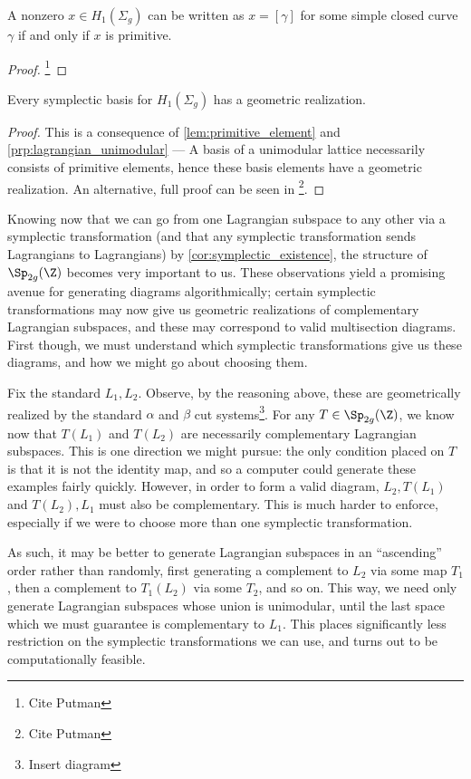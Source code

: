 \begin{lemma}
	\label{lem:primitive_element}
	A nonzero $x \in H_1(\Sigma_g)$ can be written as $x = [\gamma]$ for some simple closed curve $\gamma$ if and only if $x$ is primitive.
\end{lemma}
\begin{proof}
	\footnote{Cite Putman}
\end{proof}

\begin{theorem}
	Every symplectic basis for $H_1(\Sigma_g)$ has a geometric realization.
\end{theorem}
\begin{proof}
	This is a consequence of \autoref{lem:primitive_element} and \autoref{prp:lagrangian_unimodular} --- A basis of a unimodular lattice necessarily consists of primitive elements, hence these basis elements have a geometric realization. An alternative, full proof can be seen in \footnote{Cite Putman}.
\end{proof}

Knowing now that we can go from one Lagrangian subspace to any other via a symplectic transformation (and that any symplectic transformation sends Lagrangians to Lagrangians) by \autoref{cor:symplectic_existence}, the structure of $\Sp_{2g}(\Z)$ becomes very important to us. These observations yield a promising avenue for generating diagrams algorithmically; certain symplectic transformations may now give us geometric realizations of complementary Lagrangian subspaces, and these may correspond to valid multisection diagrams. First though, we must understand which symplectic transformations give us these diagrams, and how we might go about choosing them.

Fix the standard $L_1,L_2$. Observe, by the reasoning above, these are geometrically realized by the standard $\alpha$ and $\beta$ cut systems\footnote{Insert diagram}. For any $T \in \Sp_{2g}(\Z)$, we know now that $T(L_1)$ and $T(L_2)$ are necessarily complementary Lagrangian subspaces. This is one direction we might pursue: the only condition placed on $T$ is that it is not the identity map, and so a computer could generate these examples fairly quickly. However, in order to form a valid diagram, $L_2, T(L_1)$ and $T(L_2), L_1$ must also be complementary. This is much harder to enforce, especially if we were to choose more than one symplectic transformation.

As such, it may be better to generate Lagrangian subspaces in an ``ascending'' order rather than randomly, first generating a complement to $L_2$ via some map $T_1$, then a complement to $T_1(L_2)$ via some $T_2$, and so on. This way, we need only generate Lagrangian subspaces whose union is unimodular, until the last space which we must guarantee is complementary to $L_1$. This places significantly less restriction on the symplectic transformations we can use, and turns out to be computationally feasible.

